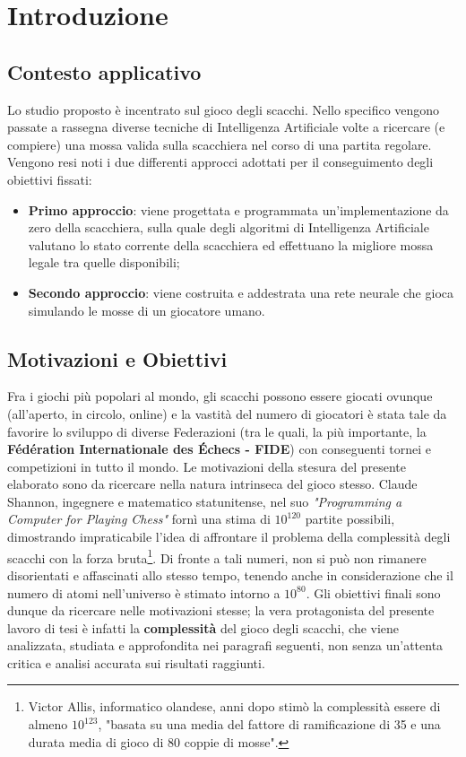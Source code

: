 \chapter{Introduzione}
\label{cap: introduzione}
\section{Contesto applicativo}
\label{cap: contesto_applicativo}
Lo studio proposto è incentrato sul gioco degli scacchi. Nello specifico vengono passate a rassegna diverse tecniche di 
Intelligenza Artificiale volte a ricercare (e compiere) una mossa valida sulla scacchiera nel corso di una partita regolare.
Vengono resi noti i due differenti approcci adottati per il conseguimento degli obiettivi fissati: 
\begin{itemize}
    \item \textbf{Primo approccio}: viene progettata e programmata un'implementazione da zero della scacchiera, sulla quale degli algoritmi di Intelligenza Artificiale valutano lo stato corrente della scacchiera ed effettuano la migliore mossa legale tra quelle disponibili;
    \item \textbf{Secondo approccio}: viene costruita e addestrata una rete neurale che gioca simulando le mosse di un giocatore umano. 
\end{itemize}

\section{Motivazioni e Obiettivi} %
Fra i giochi più popolari al mondo, gli scacchi possono essere giocati ovunque (all'aperto, in circolo, online) e la vastità del numero di 
giocatori è stata tale da favorire lo sviluppo di diverse Federazioni (tra le quali, la più importante, la 
\textbf{Fédération Internationale des Échecs - FIDE}) con conseguenti tornei e competizioni in tutto il mondo. 
Le motivazioni della stesura del presente elaborato sono da ricercare nella natura intrinseca del gioco stesso. 
Claude Shannon, ingegnere e matematico statunitense, nel suo \textit{"Programming a Computer for Playing Chess"}\cite{shannon1950xxii} fornì una stima di $10^{120}$
partite possibili, dimostrando impraticabile l'idea di affrontare il problema della complessità degli scacchi con la forza bruta\footnote{Victor Allis, informatico olandese, 
anni dopo stimò la complessità essere di almeno $10^{123}$, "basata su una media del fattore di ramificazione di 35 e una 
durata media di gioco di 80 coppie di mosse".}. Di fronte a tali numeri, non si può non rimanere disorientati e affascinati allo
stesso tempo, tenendo anche in considerazione che il numero di atomi nell'universo è stimato intorno a $10^{80}$\cite{itwiki:119558224}. 
Gli obiettivi finali sono dunque da ricercare nelle motivazioni stesse; la vera protagonista del
presente lavoro di tesi è infatti la \textbf{complessità} del gioco degli scacchi, che viene analizzata, studiata e approfondita nei paragrafi
seguenti, non senza un'attenta critica e analisi accurata sui risultati raggiunti.

